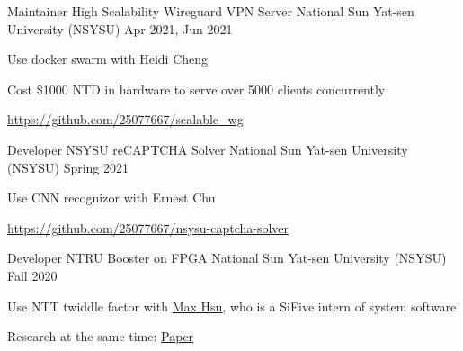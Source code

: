 \begin{cventries}
    \cventry
    {Maintainer}
    {High Scalability Wireguard VPN Server}
    {National Sun Yat-sen University (NSYSU)} %
    {Apr 2021, Jun 2021} %
    {
        \begin{cvitems} %
            \item {Use docker swarm with Heidi Cheng}
            \item {Cost \$1000 NTD in hardware to serve over 5000 clients concurrently}
            \item {\url{https://github.com/25077667/scalable_wg}}
        \end{cvitems}
    }

    \cventry
    {Developer}
    {NSYSU reCAPTCHA Solver}
    {National Sun Yat-sen University (NSYSU)} %
    {Spring 2021} %
    {
        \begin{cvitems} %
            \item {Use CNN recognizor with Ernest Chu}
            \item {\url{https://github.com/25077667/nsysu-captcha-solver}}
        \end{cvitems}
    }


    \cventry
    {Developer}
    {NTRU Booster on FPGA}
    {National Sun Yat-sen University (NSYSU)} %
    {Fall 2020} %
    {
        \begin{cvitems} %
            \item {Use NTT twiddle factor with \href{https://github.com/Max-Hsu}{Max Hsu}, who is a SiFive intern of system software}
            \item {Research at the same time: \href{http://dx.doi.org/10.6342/NTU202003012}{Paper}}
        \end{cvitems}
    }
\end{cventries}
